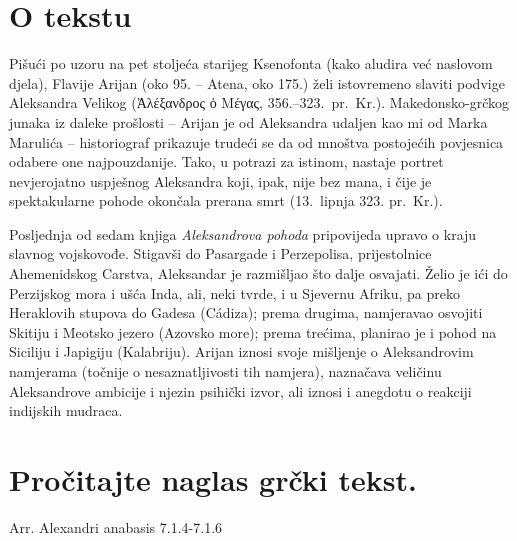 


\section*{O tekstu}

Pišući po uzoru na pet stoljeća starijeg Ksenofonta (kako aludira već naslovom djela), Flavije Arijan (oko 95. – Atena, oko 175.) želi istovremeno slaviti podvige Aleksandra Velikog (Ἀλέξανδρος ὁ Μέγας, 356.–323.\ pr.~Kr.). Makedonsko-grčkog junaka iz daleke prošlosti – Arijan je od Aleksandra udaljen kao mi od Marka Marulića – historiograf prikazuje trudeći se da od mnoštva postojećih povjesnica odabere one najpouzdanije. Tako, u potrazi za istinom, nastaje portret nevjerojatno uspješnog Aleksandra koji, ipak, nije bez mana, i čije je spektakularne pohode okončala prerana smrt (13.\ lipnja 323. pr.~Kr.).

Posljednja od sedam knjiga \textit{Aleksandrova pohoda} pripovijeda upravo o kraju slavnog vojskovođe. Stigavši do Pasargade i Perzepolisa, prijestolnice Ahemenidskog Carstva, Aleksandar je razmišljao što dalje osvajati. Želio je ići do Perzijskog mora i ušća Inda, ali, neki tvrde, i u Sjevernu Afriku, pa preko Heraklovih stupova do Gadesa (Cádiza); prema drugima, namjeravao osvojiti Skitiju i Meotsko jezero (Azovsko more); prema trećima, planirao je i pohod na Siciliju i Japigiju (Kalabriju). Arijan iznosi svoje mišljenje o Aleksandrovim namjerama (točnije o nesaznatljivosti tih namjera), naznačava veličinu Aleksandrove ambicije i njezin psihički izvor, ali iznosi i anegdotu o reakciji indijskih mudraca.

\newpage

\section*{Pročitajte naglas grčki tekst.}

Arr. Alexandri anabasis 7.1.4-7.1.6


\medskip


